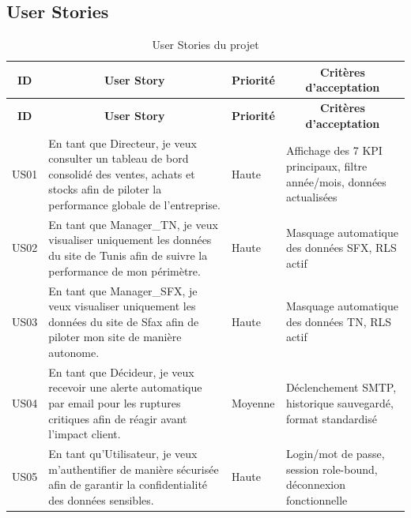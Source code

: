 \subsection{User Stories}

{\small
\renewcommand{\arraystretch}{1.2}
\setlength{\tabcolsep}{3pt}


\begin{longtable}{|p{1.8cm}|p{6cm}|p{1.8cm}|p{7cm}|}

\caption{User Stories du projet} \\

\hline
\multicolumn{1}{|c|}{\textbf{ID}} & 
\multicolumn{1}{c|}{\textbf{User Story}} & 
\multicolumn{1}{c|}{\textbf{Priorité}} & 
\multicolumn{1}{c|}{\textbf{Critères d'acceptation}} \\
\hline
\endfirsthead

\hline

\multicolumn{1}{|c|}{\textbf{ID}} & 
\multicolumn{1}{c|}{\textbf{User Story}} & 
\multicolumn{1}{c|}{\textbf{Priorité}} & 
\multicolumn{1}{c|}{\textbf{Critères d'acceptation}} \\
\hline
\endhead

\hline
\endfoot

US01 & En tant que Directeur, je veux consulter un tableau de bord consolidé des ventes, achats et stocks afin de piloter la performance globale de l'entreprise. & Haute & Affichage des 7 KPI principaux, filtre année/mois, données actualisées \\
\hline

US02 & En tant que Manager\_TN, je veux visualiser uniquement les données du site de Tunis afin de suivre la performance de mon périmètre. & Haute & Masquage automatique des données SFX, RLS actif \\
\hline

US03 & En tant que Manager\_SFX, je veux visualiser uniquement les données du site de Sfax afin de piloter mon site de manière autonome. & Haute & Masquage automatique des données TN, RLS actif \\
\hline

US04 & En tant que Décideur, je veux recevoir une alerte automatique par email pour les ruptures critiques afin de réagir avant l'impact client. & Moyenne & Déclenchement SMTP, historique sauvegardé, format standardisé \\
\hline

US05 & En tant qu'Utilisateur, je veux m'authentifier de manière sécurisée afin de garantir la confidentialité des données sensibles. & Haute & Login/mot de passe, session role-bound, déconnexion fonctionnelle \\
\hline


\end{longtable}}

